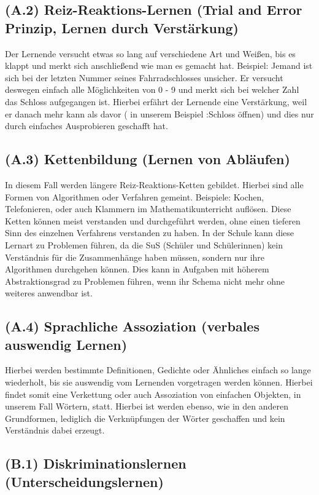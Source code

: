 \subsection[]{(A.2) Reiz-Reaktions-Lernen (Trial and Error Prinzip, Lernen durch Verstärkung)}

Der Lernende versucht etwas so lang auf verschiedene Art und Weißen, bis es klappt und merkt sich anschließend wie man es gemacht hat. 
Beispiel: Jemand ist sich bei der letzten Nummer seines Fahrradschlosses unsicher. Er versucht deswegen einfach alle Möglichkeiten von 0 - 9 und merkt sich bei welcher Zahl das Schloss aufgegangen ist. Hierbei erfährt der Lernende eine Verstärkung, weil er danach mehr kann als davor ( in unserem Beispiel :Schloss öffnen) und dies nur durch einfaches Ausprobieren geschafft hat.

\subsection[]{(A.3) Kettenbildung (Lernen von Abläufen)}

In diesem Fall werden längere Reiz-Reaktions-Ketten gebildet. Hierbei sind alle Formen von Algorithmen oder Verfahren gemeint. Beispiele: Kochen, Telefonieren, oder auch Klammern im Mathematikunterricht auflösen. Diese Ketten können meist verstanden und durchgeführt werden, ohne einen tieferen Sinn des einzelnen Verfahrens verstanden zu haben. In der Schule kann diese Lernart zu Problemen führen, da die SuS (Schüler und Schülerinnen) kein Verständnis für die Zusammenhänge haben müssen, sondern nur ihre Algorithmen durchgehen können. Dies kann in Aufgaben mit höherem Abstraktionsgrad zu Problemen führen, wenn ihr Schema nicht mehr ohne weiteres anwendbar ist.

\subsection[]{(A.4) Sprachliche Assoziation (verbales auswendig Lernen)}

Hierbei werden bestimmte Definitionen, Gedichte oder Ähnliches einfach so lange wiederholt, bis sie auswendig vom Lernenden vorgetragen werden können. Hierbei findet somit eine Verkettung oder auch Assoziation von einfachen Objekten, in unserem Fall Wörtern, statt. Hierbei ist werden ebenso, wie in den anderen Grundformen, lediglich die Verknüpfungen der Wörter geschaffen und kein Verständnis dabei erzeugt. 

\subsection[]{(B.1) Diskriminationslernen (Unterscheidungslernen)}

